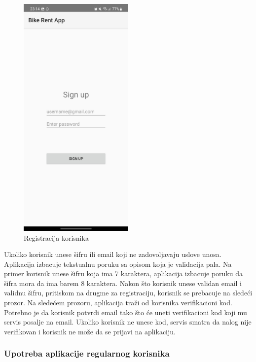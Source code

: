 \documentclass[12pt,oneside]{memoir}
\begin{document}
\begin{figure}[!ht]
  \centering
  \includegraphics[width=0.5\textwidth]{Registracija.jpg}
  \caption{Registracija korisnika}
  \label{fig:registracijaKorisnika}
\end{figure}

 
Ukoliko korisnik unese šifru ili email koji ne zadovoljavaju uslove unosa. Aplikacija izbacuje tekstualnu poruku sa opisom koja je validacija pala. Na primer korisnik unese šifru koja ima 7 karaktera, aplikacija izbacuje poruku da šifra mora da ima barem 8 karaktera. Nakon što korisnik unese validan email i validnu šifru, pritiskom na drugme za registraciju, korisnik se prebacuje na sledeći prozor. Na sledećem prozoru, aplikacija traži od korisnika verifikacioni kod. Potrebno je da korisnik potvrdi email tako što će uneti verifikacioni kod koji mu servis posalje na email. Ukoliko korisnik ne unese kod, servis smatra da nalog nije verifikovan i korisnik ne može da se prijavi na aplikaciju.
 
\subsubsection{Upotreba aplikacije regularnog korisnika}
 
\end{document}
